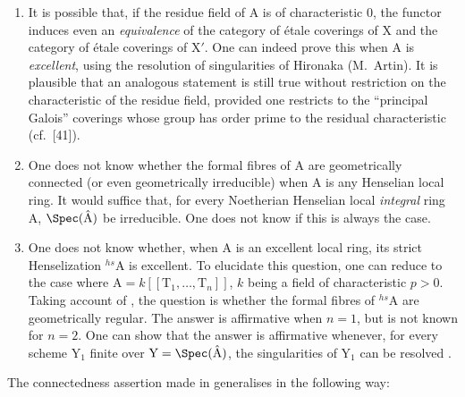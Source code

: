 \begin{remarks}[18.9.6]
\label{IV.18.9.6}
\begin{enumerate}[label=\emph{\roman*)}]
  \item It is possible that, if the residue field of A is of characteristic 0, the functor  induces even an \emph{equivalence} of the category of \'{e}tale coverings of X and the category of \'{e}tale coverings of $\mathrm{X}'$.
  One can indeed prove this when A is \emph{excellent}, using the resolution of singularities of Hironaka (M.~Artin).
  It is plausible that an analogous statement is still true without restriction on the characteristic of the residue field, provided one restricts to the ``principal Galois'' coverings whose group has order prime to the residual characteristic (cf.~[41]).

  \item One does not know whether the formal fibres of A are geometrically connected (or even geometrically irreducible) when A is any Henselian local ring.
  It would suffice that, for every Noetherian Henselian local \emph{integral} ring A, $\Spec(\hat{\mathrm{A}})$ be irreducible.
  One does not know if this is always the case.

  \item One does not know whether, when A is an excellent local ring, its strict Henselization ${}^{hs}\!\mathrm{A}$ is excellent.
  To elucidate this question, one can reduce to the case where $\mathrm{A}=k[[\mathrm{T}_1,\ldots,\mathrm{T}_n]]$, $k$ being a field of characteristic $p>0$.
  Taking account of , the question is whether the formal fibres of ${}^{hs}\!\mathrm{A}$ are geometrically regular.
  The answer is affirmative when $n=1$, but is not known for $n=2$.
  One can show that the answer is affirmative whenever, for every scheme $\mathrm{Y}_1$ finite over $\mathrm{Y}=\Spec(\hat{\mathrm{A}})$, the singularities of $\mathrm{Y}_1$ can be resolved .
\end{enumerate}
\end{remarks}

The connectedness assertion made in  generalises in the following way:

